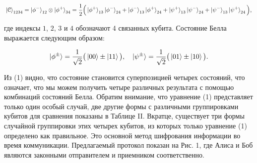 \documentclass[a4paper,11pt]{article}
\begin{document}
\begin{equation*}
\ket{\mathcal{C}}_{1234} = \ket{\phi^-}_{12} \otimes \ket{\phi^+}_{34}
= \dfrac{1}{2} \Big(\ket{\phi^+}_{13} \ket{\phi^-}_{24} + 
 					\ket{\phi^-}_{13} \ket{\phi^+}_{24} +
 					\ket{\psi^+}_{13} \ket{\psi^-}_{24} +
 					\ket{\psi^-}_{13} \ket{\psi^+}_{24} \Big),
\end{equation*}

где индексы $1$, $2$, $3$ и $4$ обозначают 4 связанных кубита. Состояние Белла выражается следующим образом:

\begin{equation*}
\ket{\phi^{\pm}} = \dfrac{1}{\sqrt2}\big(\ket{00} \pm \ket{11} \big), \quad
\ket{\psi^{\pm}} = \dfrac{1}{\sqrt2}\big(\ket{01} \pm \ket{10} \big).
\end{equation*}


Из (1) видно, что состояние становится суперпозицией четырех состояний, что означает, что мы можем получить четыре различных результата с помощью комбинаций состояний Белла. Обратим внимание, что уравнение (1) представляет только один особый случай, две другие формы с различными группировками кубитов для сравнения показаны в Таблице II. Вкратце, существует три формы случайной группировки этих четырех кубитов, из которых только уравнение (1) определено как правильное. Это основной метод шифрования информации во время коммуникации. Предлагаемый протокол показан на Рис. 1, где Алиса и Боб являются законными отправителем и приемником соответственно.

\begin{figure}[h]
	\label{ris:image1}
\end{figure}
\end{document}
